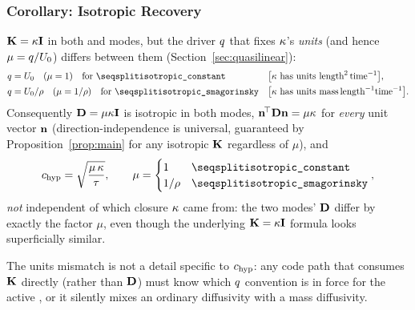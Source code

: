 \subsubsection{Corollary: Isotropic Recovery}
\begin{corollary}
\label{cor:isotropic}
$\mathbf{K}=\kappa\mathbf I$ in both  and
 modes, but the driver $q$ that fixes
$\kappa$'s \emph{units} (and hence $\mu=q/U_0$) differs between
them (Section~\ref{sec:quasilinear}):
\begin{align}
  \driver &= U_0 \quad (\mu=1)\quad \text{for \code{isotropic\_constant}}
  && \big[\kappaP\ \text{has units}\ \text{length}^2\,\text{time}^{-1}\big] , \\
  \driver &= U_0/\rho \quad (\mu=1/\rho)\quad \text{for \code{isotropic\_smagorinsky}}
  && \big[\kappaP\ \text{has units}\ \text{mass}\,\text{length}^{-1}\text{time}^{-1}\big] .
\end{align}
Consequently $\mathbf{D}=\mu\kappa\mathbf I$ is isotropic in both modes,
$\mathbf{n}^{\!\top}\mathbf{D}\mathbf{n} = \mu\kappa$ for \emph{every} unit vector
$\mathbf{n}$ (direction-independence is universal, guaranteed by
Proposition~\ref{prop:main} for any isotropic $\mathbf{K}$ regardless of
$\mu$), and
\begin{equation}
  \chyp = \sqrt{\frac{\mu\,\kappaP}{\taurelax}} ,
  \qquad
  \mu = \begin{cases} 1 & \text{\code{isotropic\_constant}} \\
                       1/\rho & \text{\code{isotropic\_smagorinsky}} \end{cases} ,
\end{equation}
\emph{not} independent of which closure $\kappa$ came from: the two
modes' $\mathbf{D}$ differ by exactly the factor $\mu$, even though the
underlying $\mathbf{K}=\kappa\mathbf I$ formula looks superficially similar.
\end{corollary}
The units mismatch is not a detail specific to $c_{\rm hyp}$: any code path
that consumes $\mathbf{K}$ directly (rather than $\mathbf{D}$) must know which
$q$ convention is in force for the active , or
it silently mixes an ordinary diffusivity with a mass diffusivity.

